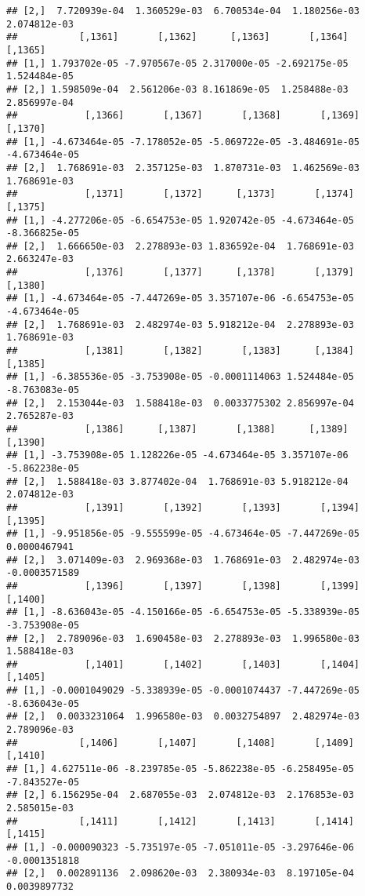 \documentclass[
]{article}
\begin{document}
\begin{verbatim}
## [2,]  7.720939e-04  1.360529e-03  6.700534e-04  1.180256e-03  2.074812e-03
##           [,1361]       [,1362]      [,1363]       [,1364]      [,1365]
## [1,] 1.793702e-05 -7.970567e-05 2.317000e-05 -2.692175e-05 1.524484e-05
## [2,] 1.598509e-04  2.561206e-03 8.161869e-05  1.258488e-03 2.856997e-04
##            [,1366]       [,1367]       [,1368]       [,1369]       [,1370]
## [1,] -4.673464e-05 -7.178052e-05 -5.069722e-05 -3.484691e-05 -4.673464e-05
## [2,]  1.768691e-03  2.357125e-03  1.870731e-03  1.462569e-03  1.768691e-03
##            [,1371]       [,1372]      [,1373]       [,1374]       [,1375]
## [1,] -4.277206e-05 -6.654753e-05 1.920742e-05 -4.673464e-05 -8.366825e-05
## [2,]  1.666650e-03  2.278893e-03 1.836592e-04  1.768691e-03  2.663247e-03
##            [,1376]       [,1377]      [,1378]       [,1379]       [,1380]
## [1,] -4.673464e-05 -7.447269e-05 3.357107e-06 -6.654753e-05 -4.673464e-05
## [2,]  1.768691e-03  2.482974e-03 5.918212e-04  2.278893e-03  1.768691e-03
##            [,1381]       [,1382]       [,1383]      [,1384]       [,1385]
## [1,] -6.385536e-05 -3.753908e-05 -0.0001114063 1.524484e-05 -8.763083e-05
## [2,]  2.153044e-03  1.588418e-03  0.0033775302 2.856997e-04  2.765287e-03
##            [,1386]      [,1387]       [,1388]      [,1389]       [,1390]
## [1,] -3.753908e-05 1.128226e-05 -4.673464e-05 3.357107e-06 -5.862238e-05
## [2,]  1.588418e-03 3.877402e-04  1.768691e-03 5.918212e-04  2.074812e-03
##            [,1391]       [,1392]       [,1393]       [,1394]       [,1395]
## [1,] -9.951856e-05 -9.555599e-05 -4.673464e-05 -7.447269e-05  0.0000467941
## [2,]  3.071409e-03  2.969368e-03  1.768691e-03  2.482974e-03 -0.0003571589
##            [,1396]       [,1397]       [,1398]       [,1399]       [,1400]
## [1,] -8.636043e-05 -4.150166e-05 -6.654753e-05 -5.338939e-05 -3.753908e-05
## [2,]  2.789096e-03  1.690458e-03  2.278893e-03  1.996580e-03  1.588418e-03
##            [,1401]       [,1402]       [,1403]       [,1404]       [,1405]
## [1,] -0.0001049029 -5.338939e-05 -0.0001074437 -7.447269e-05 -8.636043e-05
## [2,]  0.0033231064  1.996580e-03  0.0032754897  2.482974e-03  2.789096e-03
##           [,1406]       [,1407]       [,1408]       [,1409]       [,1410]
## [1,] 4.627511e-06 -8.239785e-05 -5.862238e-05 -6.258495e-05 -7.843527e-05
## [2,] 6.156295e-04  2.687055e-03  2.074812e-03  2.176853e-03  2.585015e-03
##           [,1411]       [,1412]       [,1413]       [,1414]       [,1415]
## [1,] -0.000090323 -5.735197e-05 -7.051011e-05 -3.297646e-06 -0.0001351818
## [2,]  0.002891136  2.098620e-03  2.380934e-03  8.197105e-04  0.0039897732

\end{verbatim}
\end{document}
